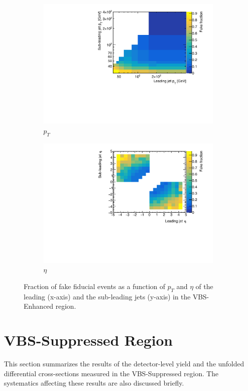 \begin{figure}[htb]
    \centering
    \begin{subfigure}{.48\textwidth}
        \centering
        \includegraphics[width=.9\linewidth]{figures/Analysis/Unfolding/FakeFraction_pt_jets.pdf}
        \caption{ $p_{T}$ \label{fig:FidFakespT}}
    \end{subfigure}
    \begin{subfigure}{.48\textwidth}
        \centering
        \includegraphics[width=.9\linewidth]{figures/Analysis/Unfolding/FakeFraction_eta_jets.pdf}
        \caption{$\eta$\label{fig:FidFakeseta}}
    \end{subfigure}
    \caption{ Fraction of fake fiducial events as a function of $p_{T}$ and $\eta$ of the leading (x-axis) and the sub-leading jets (y-axis) in the VBS-Enhanced region.\label{fig:fake_fraction_jets}}
\end{figure}

\section{VBS-Suppressed Region}
\label{Appendix:VBSSupRegion}
This section summarizes the results of the detector-level yield and the unfolded differential cross-sections measured in the VBS-Suppressed region. The systematics affecting these results are also discussed briefly.

